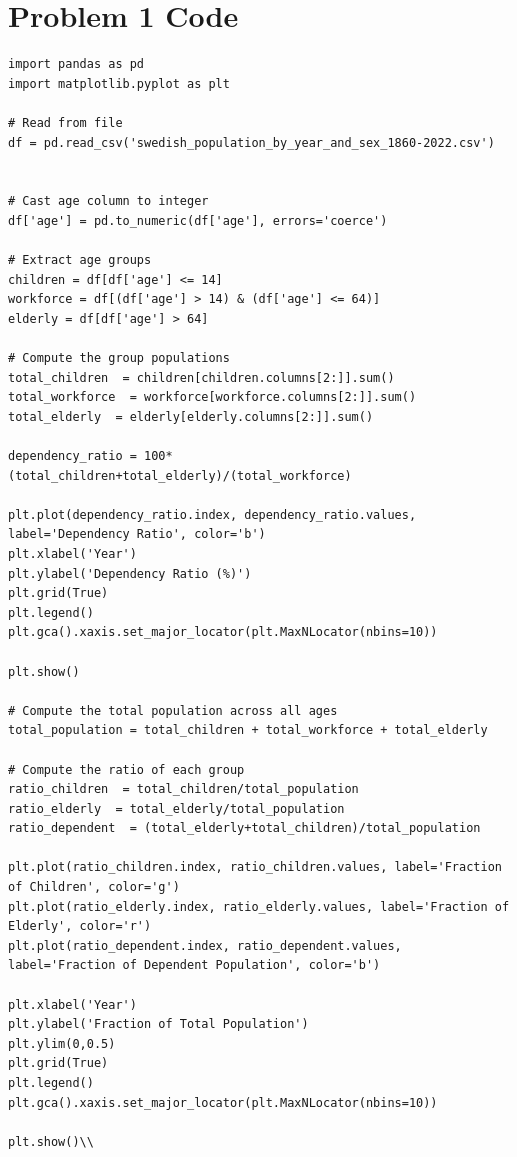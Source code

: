 \documentclass[a4paper]{article}
\begin{document}
\printbibliography
\appendix

\section*{Problem 1 Code}
\label{app:code}

\begin{lstlisting}
import pandas as pd
import matplotlib.pyplot as plt

# Read from file
df = pd.read_csv('swedish_population_by_year_and_sex_1860-2022.csv')


# Cast age column to integer
df['age'] = pd.to_numeric(df['age'], errors='coerce')

# Extract age groups
children = df[df['age'] <= 14]
workforce = df[(df['age'] > 14) & (df['age'] <= 64)]
elderly = df[df['age'] > 64]

# Compute the group populations
total_children  = children[children.columns[2:]].sum()
total_workforce  = workforce[workforce.columns[2:]].sum()
total_elderly  = elderly[elderly.columns[2:]].sum()

dependency_ratio = 100*(total_children+total_elderly)/(total_workforce)

plt.plot(dependency_ratio.index, dependency_ratio.values, label='Dependency Ratio', color='b')
plt.xlabel('Year')
plt.ylabel('Dependency Ratio (%)')
plt.grid(True)
plt.legend()
plt.gca().xaxis.set_major_locator(plt.MaxNLocator(nbins=10))

plt.show()

# Compute the total population across all ages
total_population = total_children + total_workforce + total_elderly

# Compute the ratio of each group
ratio_children  = total_children/total_population
ratio_elderly  = total_elderly/total_population
ratio_dependent  = (total_elderly+total_children)/total_population

plt.plot(ratio_children.index, ratio_children.values, label='Fraction of Children', color='g')
plt.plot(ratio_elderly.index, ratio_elderly.values, label='Fraction of Elderly', color='r')
plt.plot(ratio_dependent.index, ratio_dependent.values, label='Fraction of Dependent Population', color='b')

plt.xlabel('Year')
plt.ylabel('Fraction of Total Population')
plt.ylim(0,0.5)
plt.grid(True)
plt.legend()
plt.gca().xaxis.set_major_locator(plt.MaxNLocator(nbins=10))

plt.show()\\

\end{lstlisting}
\end{document}
